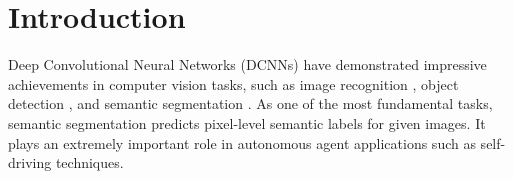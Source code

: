 \documentclass[runningheads]{llncs}
\begin{document}
\section{Introduction}
	Deep Convolutional Neural Networks (DCNNs) have demonstrated impressive achievements in computer vision tasks, such as image recognition \cite{he2016deep}, object detection \cite{girshick2015fast}, and semantic segmentation \cite{long2015fully}. As one of the most fundamental tasks, semantic segmentation predicts pixel-level semantic labels for given images. It plays an extremely important role in autonomous agent applications such as self-driving techniques.
	
	\begin{comment}
	\begin{figure}
		\begin{center}
\texttt{[image: Figure/Figure\_4/figure4.eps]}
		\end{center}
\caption{Illustration of (A) global feature alignment using adversarial learning and (B) our proposed method that aligns feature space of two domains by performing image reconstruction from the label space.}
		\label{fig:motivation}
\end{figure}
	\end{comment}
	
\end{document}
